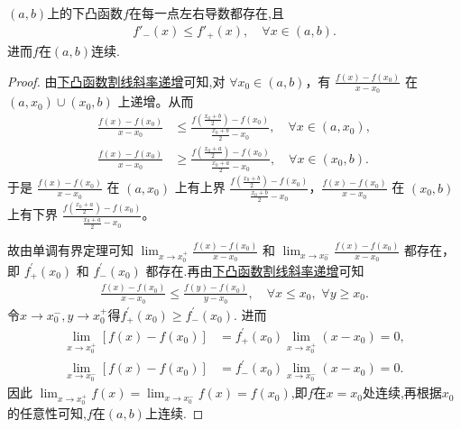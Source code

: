 \documentclass[../../main.tex]{subfiles}%
\begin{document}
\begin{theorem}[开区间下凸函数左右导数处处存在]\label{theorem:开区间下凸函数左右导数处处存在}
\((a,b)\)上的下凸函数\(f\)在每一点左右导数都存在,且
\begin{align*}
f'_-(x)\leqslant f'_+(x),\quad \forall x\in (a,b).
\end{align*}
进而\(f\)在\((a,b)\)连续.
\end{theorem}
\begin{proof}

由\hyperref[下凸函数割线斜率递增]{下凸函数割线斜率递增}可知,对 $\forall x_0\in (a,b)$，有 $\frac{f(x) - f(x_0)}{x - x_0}$ 在 $(a,x_0) \cup (x_0,b)$ 上递增。从而
\begin{align*}
\frac{f(x) - f(x_0)}{x - x_0} &\leqslant \frac{f\left(\frac{x_0 + b}{2}\right) - f(x_0)}{\frac{x_0 + b}{2} - x_0}, \quad \forall x\in (a,x_0), \\
\frac{f(x) - f(x_0)}{x - x_0} &\geqslant \frac{f\left(\frac{x_0 + a}{2}\right) - f(x_0)}{\frac{x_0 + a}{2} - x_0}, \quad \forall x\in (x_0,b).
\end{align*}
于是 $\frac{f(x) - f(x_0)}{x - x_0}$ 在 $(a,x_0)$ 上有上界 $\frac{f\left(\frac{x_0 + b}{2}\right) - f(x_0)}{\frac{x_0 + b}{2} - x_0}$，$\frac{f(x) - f(x_0)}{x - x_0}$ 在 $(x_0,b)$ 上有下界 $\frac{f\left(\frac{x_0 + a}{2}\right) - f(x_0)}{\frac{x_0 + a}{2} - x_0}$。

故由单调有界定理可知 $\lim_{x \to x_0^+} \frac{f(x) - f(x_0)}{x - x_0}$ 和 $\lim_{x \to x_0^-} \frac{f(x) - f(x_0)}{x - x_0}$ 都存在，即 $f_{+}^{\prime}(x_0)$ 和 $f_{-}^{\prime}(x_0)$ 都存在.再由\hyperref[下凸函数割线斜率递增]{下凸函数割线斜率递增}可知
\begin{align*}
\frac{f\left( x \right) -f\left( x_0 \right)}{x-x_0}\leqslant \frac{f\left( y \right) -f\left( x_0 \right)}{y-x_0},\quad \forall x\leqslant x_0,\,\,\forall y\geqslant x_0.
\end{align*}
令$x\to x_0^-,y\to x_0^+$得$f_{+}^{\prime}(x_0)\geqslant f_{-}^{\prime}(x_0)$.
进而
\begin{align*}
\lim_{x \to x_0^+} [f(x) - f(x_0)] &=f_{+}^{\prime}(x_0) \lim_{x \to x_0^+} (x - x_0) = 0, \\
\lim_{x \to x_0^-} [f(x) - f(x_0)] &=f_{-}^{\prime}(x_0) \lim_{x \to x_0^-} (x - x_0) = 0.
\end{align*}
因此 $\lim_{x \to x_0^+} f(x) = \lim_{x \to x_0^-} f(x) = f(x_0)$,即$f$在$x=x_0$处连续,再根据$x_0$的任意性可知,$f$在$(a,b)$上连续.

\end{proof}
\end{document}
